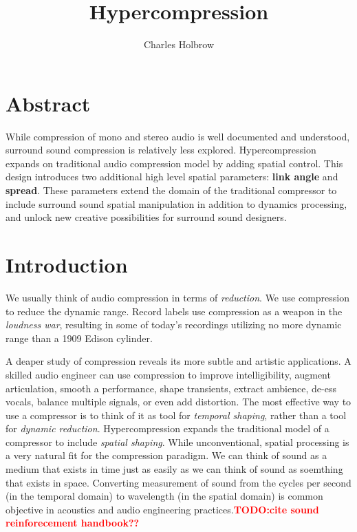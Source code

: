 \documentclass{tufte-book}
\title{Hypercompression}
\author{Charles Holbrow}
\newcommand{\TODO}[1]{\textcolor{red}{\bf TODO:#1}\xspace}
\newcommand{\thesis}{Hypercompression\xspace}
\begin{document}
\frontmatter

\maketitle

\tableofcontents

\mainmatter

\chapter{Abstract}
\label{cha:abstract}

\marginnote{\TODO{ Abstract is copy/pasted from another section, and
    should probably be re-written from scratch}} While compression of
mono and stereo audio is well documented and
understood,\cite{Giannoulis2012, Blesser1969} surround sound
compression is relatively less explored.  \thesis expands on
traditional audio compression model by adding spatial control. This
design introduces two additional high level spatial parameters:
\textbf{link angle} and \textbf{spread}. These parameters extend the
domain of the traditional compressor to include surround sound spatial
manipulation in addition to dynamics processing, and unlock new
creative possibilities for surround sound designers.


\cleardoublepage
\chapter{Introduction}
\label{ch:introduction}

We usually think of audio compression in terms of \emph{reduction}. We
use compression to reduce the dynamic range. Record labels use
compression as a weapon in the \emph{loudness war}\cite{Deruty2014a},
resulting in some of today's recordings utilizing no more dynamic
range than a 1909 Edison cylinder.\cite{Katz2007} 

A deaper study of compression reveals its more subtle and artistic
applications. A skilled audio engineer can use compression to improve
intelligibility, augment articulation, smooth a performance, shape
transients, extract ambience, de-ess vocals, balance multiple signals,
or even add distortion.\cite{Case2007} The most effective way to use a
compressor is to think of it as tool for \emph{temporal shaping},
rather than a tool for \emph{dynamic reduction}. \thesis expands the
traditional model of a compressor to include \emph{spatial
  shaping}. While unconventional, spatial processing is a very natural
fit for the compression paradigm. We can think of sound as a medium
that exists in time just as easily as we can think of sound as
soemthing that exists in space. Converting measurement of sound from
the cycles per second (in the temporal domain) to wavelength (in the
spatial domain) is common objective in acoustics and audio engineering
practices.\TODO{cite sound reinforecement handbook??}
\end{document}
